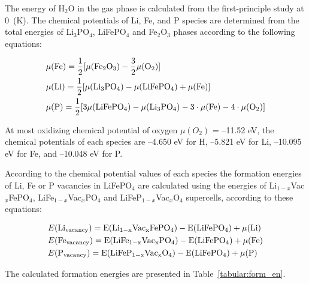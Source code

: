 The energy of H$_2$O in the gas phase is calculated from the first-principle study at 0~(K). The chemical potentials of Li, Fe, and P species are determined from the total energies of Li$_3$PO$_4$, LiFePO$_4$ and Fe$_2$O$_3$ phases according to the following equations:

\begin{eqnarray}
\label{FeLiP}
  &\mu(\rm Fe)=\frac{1}{2}[\mu(\rm Fe_2O_3)-\frac{3}{2}\mu(\rm O_2)] \nonumber \\ 
  &\mu(\rm Li)=\frac{1}{2}[\mu(\rm Li_3PO_4)-\mu(\rm LiFePO_4)+\mu(\rm Fe)] \\
  &\mu(\rm P)=\frac{1}{2}[3\mu(\rm LiFePO_4)-\mu(\rm Li_3PO_4)-3\cdot\mu(\rm Fe)-4\cdot\mu(\rm O_2)] \nonumber
\end{eqnarray}

At most oxidizing chemical potential of oxygen $\mu (O_2)$ = --11.52 eV, the chemical potentials of each species are  --4.650 eV for H, --5.821 eV for Li, --10.095 eV for Fe, and --10.048 eV for P.

According to the chemical potential values of each species the formation energies of Li, Fe or P vacancies in LiFePO$_4$ are calculated using the energies of Li$_{1-x}$Vac$_{x}$FePO$_4$,  LiFe$_{1-x}$Vac$_{x}$PO$_4$  and LiFeP$_{1-x}$Vac$_{x}$O$_4$ supercells, according to these equations:

\begin{eqnarray}
\label{eq:FeLiP1}
  &E(\rm Li_{vacancy})=E(\rm Li_{1-x}Vac_{x}FePO_4)-E(\rm LiFePO_4)+\mu(\rm Li) \nonumber \\ 
  &E(\rm Fe_{vacancy})=E(\rm LiFe_{1-x}Vac_{x}PO_4)-E(\rm LiFePO_4)+\mu(\rm Fe) \\
  &E(\rm P_{vacancy})=E(\rm LiFeP_{1-x}Vac_{x}O_4)-E(\rm LiFePO_4)+\mu(\rm P) \nonumber
\end{eqnarray}

The calculated formation energies are presented in Table~\ref{tabular:form_en}.


